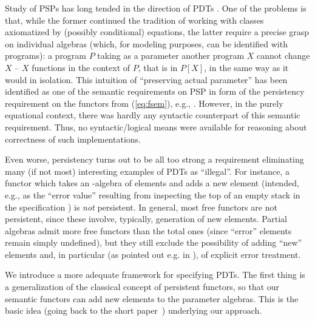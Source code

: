 Study of PSPs has long tended in the direction of PDTs \cite{paramADJ,Alge,paramGanz,CATs}. 
One of the problems
is that, while the former continued the tradition of working with classes
axiomatized by (possibly conditional) equations, the latter require a precise
grasp on individual algebras (which, for modeling purposes, can be
identified with programs): a program $P$ taking as a parameter another program
$X$ cannot change $X$ -- $X$ functions in the context of $P$, that is in $P[X]$, in the
same way as it would in isolation. This intuition of ``preserving actual
parameter'' has been identified as one of the semantic requirements on PSP in
form of the persistency requirement on the functors from (\ref{eq:fsem}),
e.g., \cite{paramGanz,paramPers,Alge}.
However, in the purely equational context, there was hardly any syntactic
counterpart of this semantic requirement. Thus, no syntactic/logical means
were available for reasoning about correctness of such implementations.

Even worse, persistency turns out to be all too strong a requirement
eliminating many (if not most) interesting examples of PDTs as
``illegal''. For instance, a functor which takes an -algebra of elements and
adds a new element (intended, e.g., as the ``error value'' resulting from inspecting the top of an empty
stack in the specification ) is {\em not} persistent. In
general, most free functors are not persistent, since these involve,
typically, generation of new elements. Partial algebras admit more free
functors than the total ones (since ``error'' elements remain simply
undefined), but they still exclude the possibility of adding ``new'' elements
and, in particular (as pointed out e.g. in \cite{partial}), of explicit error treatment.

We introduce a more adequate framework for specifying PDTs. The first
thing is a generalization of the classical concept of persistent functors, so
that our semantic functors can add new elements to the parameter algebras. 
This is the basic idea (going back to the short paper~\cite{paramPoigne})
underlying our approach.

